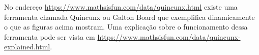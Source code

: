 No endereço \url{https://www.mathsisfun.com/data/quincunx.html} existe uma ferramenta chamada Quincunx ou Galton Board que exemplifica dinamicamente o que as figuras acima mostram. Uma explicação sobre o funcionamento dessa ferramenta pode ser vista em \url{https://www.mathsisfun.com/data/quincunx-explained.html}. 